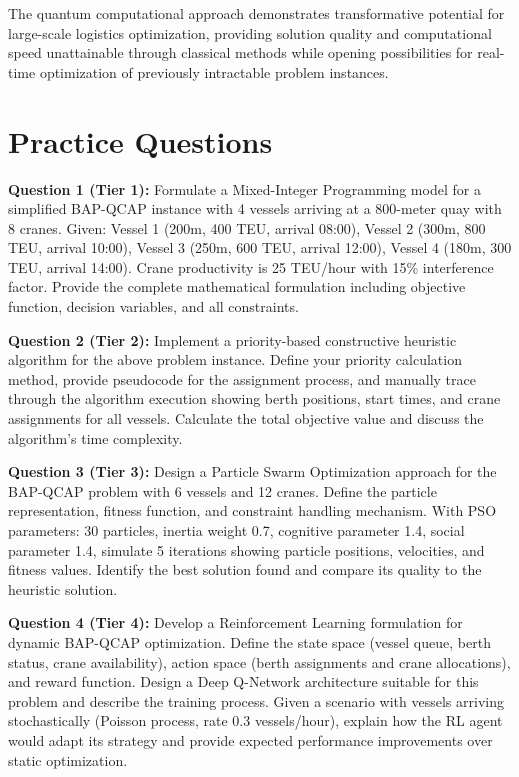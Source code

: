 \documentclass{article}
\begin{document}
The quantum computational approach demonstrates transformative potential for large-scale logistics optimization, providing solution quality and computational speed unattainable through classical methods while opening possibilities for real-time optimization of previously intractable problem instances.

\section{Practice Questions}

\textbf{Question 1 (Tier 1):} Formulate a Mixed-Integer Programming model for a simplified BAP-QCAP instance with 4 vessels arriving at a 800-meter quay with 8 cranes. Given: Vessel 1 (200m, 400 TEU, arrival 08:00), Vessel 2 (300m, 800 TEU, arrival 10:00), Vessel 3 (250m, 600 TEU, arrival 12:00), Vessel 4 (180m, 300 TEU, arrival 14:00). Crane productivity is 25 TEU/hour with 15\% interference factor. Provide the complete mathematical formulation including objective function, decision variables, and all constraints.

\textbf{Question 2 (Tier 2):} Implement a priority-based constructive heuristic algorithm for the above problem instance. Define your priority calculation method, provide pseudocode for the assignment process, and manually trace through the algorithm execution showing berth positions, start times, and crane assignments for all vessels. Calculate the total objective value and discuss the algorithm's time complexity.

\textbf{Question 3 (Tier 3):} Design a Particle Swarm Optimization approach for the BAP-QCAP problem with 6 vessels and 12 cranes. Define the particle representation, fitness function, and constraint handling mechanism. With PSO parameters: 30 particles, inertia weight 0.7, cognitive parameter 1.4, social parameter 1.4, simulate 5 iterations showing particle positions, velocities, and fitness values. Identify the best solution found and compare its quality to the heuristic solution.

\textbf{Question 4 (Tier 4):} Develop a Reinforcement Learning formulation for dynamic BAP-QCAP optimization. Define the state space (vessel queue, berth status, crane availability), action space (berth assignments and crane allocations), and reward function. Design a Deep Q-Network architecture suitable for this problem and describe the training process. Given a scenario with vessels arriving stochastically (Poisson process, rate 0.3 vessels/hour), explain how the RL agent would adapt its strategy and provide expected performance improvements over static optimization.
\end{document}
